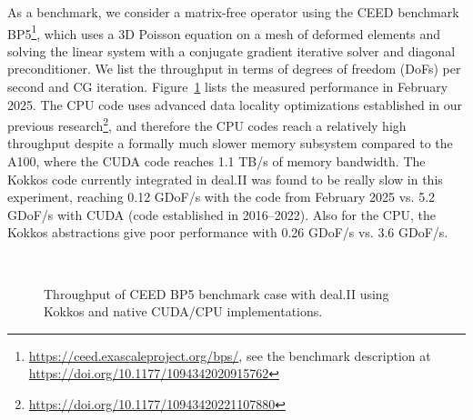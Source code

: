 \documentclass[a4paper,12pt]{article}
\begin{document}
As a benchmark, we consider a matrix-free operator using the CEED benchmark
BP5\footnote{\url{https://ceed.exascaleproject.org/bps/}, see the benchmark
  description at \url{https://doi.org/10.1177/1094342020915762}}, which uses a
3D Poisson equation on a mesh of deformed elements and solving the linear
system with a conjugate gradient iterative solver and diagonal
preconditioner. We list the throughput in terms of degrees of freedom (DoFs)
per second and CG iteration. Figure~\ref{fig:bp5} lists the measured
performance in February 2025. The CPU code uses advanced data locality
optimizations established in our previous
research\footnote{\url{https://doi.org/10.1177/10943420221107880}}, and
therefore the CPU codes reach a relatively high throughput despite a formally
much slower memory subsystem compared to the A100, where the CUDA code reaches
1.1 TB/s of memory bandwidth. The Kokkos code currently integrated in deal.II
was found to be really slow in this experiment, reaching 0.12 GDoF/s with the
code from February 2025 vs. 5.2 GDoF/s with CUDA (code established in
2016--2022). Also for the CPU, the Kokkos abstractions give poor performance
with 0.26 GDoF/s vs. 3.6 GDoF/s.

\begin{figure}
  \centering
  \\
  \strut\hfill{}\hfill\strut
  \caption{Throughput of CEED BP5 benchmark case with deal.II using Kokkos and native CUDA/CPU implementations.}
  \label{fig:bp5}
\end{figure}
\end{document}
